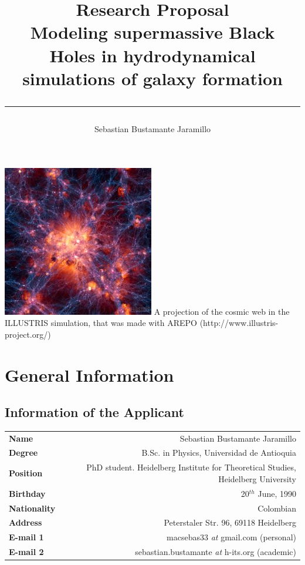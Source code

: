 \documentclass[a4,useAMS,usenatbib,usegraphicx,12pt]{article}
\title{{\textbf{Research Proposal}}\\ 
				Modeling supermassive Black Holes in hydrodynamical simulations of
				galaxy formation\\ 
				\color{black}\rule{15cm}{0.5mm}}
\author{Sebastian Bustamante Jaramillo}
\date{}
\begin{document}
\maketitle
\begin{center}
\includegraphics[trim = 0mm 3.5cm 0mm 3.0cm, clip, keepaspectratio=true,
width=0.7\textheight]{Presentation1.png}
\tiny{A projection of the cosmic web in the ILLUSTRIS simulation, that was made
with AREPO (http://www.illustris-project.org/)}
\end{center}
\tableofcontents
 
\newpage 

\section{General Information}
\small
\subsection*{Information of the Applicant}
\begin{tabular}{L!{\VRule}R}
\bf Name		& Sebastian Bustamante Jaramillo\\
\bf Degree		& B.Sc. in Physics, Universidad de Antioquia\\
\bf Position	& PhD student. Heidelberg Institute for Theoretical Studies, Heidelberg University\\
\bf Birthday	& { 20$^{th}$ June, 1990}\\
\bf Nationality & Colombian\\
\bf Address	& Peterstaler Str. 96, 69118 Heidelberg\\
\bf E-mail 1	& macsebas33 \textit{at} gmail.com (personal)\\
\bf E-mail 2	& sebastian.bustamante \textit{at} h-its.org (academic)\\
\end{tabular}
\end{document}
